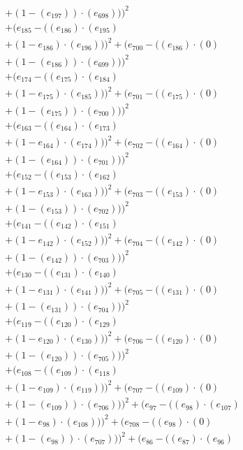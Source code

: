 \documentclass[10pt, a4paper]{article}
\begin{document}
\begin{align*}
& + (1 - (e_{197})) \cdot (e_{698})))^{2} \\
& + (e_{185} - ((e_{186})  \cdot  (e_{195}) \\
& + (1 - e_{186})  \cdot  (e_{196})))^{2} + (e_{700} - ((e_{186}) \cdot (0) \\
& + (1 - (e_{186})) \cdot (e_{699})))^{2} \\
& + (e_{174} - ((e_{175})  \cdot  (e_{184}) \\
& + (1 - e_{175})  \cdot  (e_{185})))^{2} + (e_{701} - ((e_{175}) \cdot (0) \\
& + (1 - (e_{175})) \cdot (e_{700})))^{2} \\
& + (e_{163} - ((e_{164})  \cdot  (e_{173}) \\
& + (1 - e_{164})  \cdot  (e_{174})))^{2} + (e_{702} - ((e_{164}) \cdot (0) \\
& + (1 - (e_{164})) \cdot (e_{701})))^{2} \\
& + (e_{152} - ((e_{153})  \cdot  (e_{162}) \\
& + (1 - e_{153})  \cdot  (e_{163})))^{2} + (e_{703} - ((e_{153}) \cdot (0) \\
& + (1 - (e_{153})) \cdot (e_{702})))^{2} \\
& + (e_{141} - ((e_{142})  \cdot  (e_{151}) \\
& + (1 - e_{142})  \cdot  (e_{152})))^{2} + (e_{704} - ((e_{142}) \cdot (0) \\
& + (1 - (e_{142})) \cdot (e_{703})))^{2} \\
& + (e_{130} - ((e_{131})  \cdot  (e_{140}) \\
& + (1 - e_{131})  \cdot  (e_{141})))^{2} + (e_{705} - ((e_{131}) \cdot (0) \\
& + (1 - (e_{131})) \cdot (e_{704})))^{2} \\
& + (e_{119} - ((e_{120})  \cdot  (e_{129}) \\
& + (1 - e_{120})  \cdot  (e_{130})))^{2} + (e_{706} - ((e_{120}) \cdot (0) \\
& + (1 - (e_{120})) \cdot (e_{705})))^{2} \\
& + (e_{108} - ((e_{109})  \cdot  (e_{118}) \\
& + (1 - e_{109})  \cdot  (e_{119})))^{2} + (e_{707} - ((e_{109}) \cdot (0) \\
& + (1 - (e_{109})) \cdot (e_{706})))^{2} + (e_{97} - ((e_{98})  \cdot  (e_{107}) \\
& + (1 - e_{98})  \cdot  (e_{108})))^{2} + (e_{708} - ((e_{98}) \cdot (0) \\
& + (1 - (e_{98})) \cdot (e_{707})))^{2} + (e_{86} - ((e_{87})  \cdot  (e_{96}) \\

\end{align*}
\end{document}
